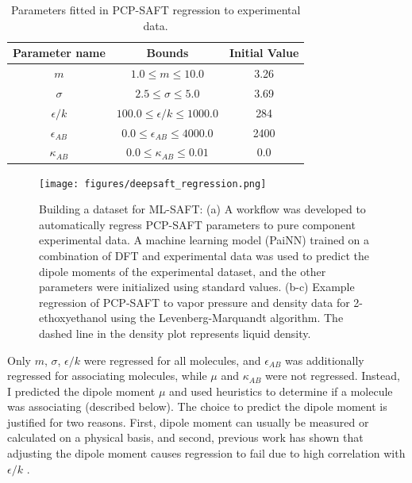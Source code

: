 \begin{table}
    \centering
    \caption{Parameters fitted in PCP-SAFT regression to experimental data.}
    \label{tab:regression_params}
    \begin{tabular}{ccc}
        Parameter name & Bounds & Initial Value \\
        \hline
        $m$ & $1.0 \leq m \leq 10.0$ & 3.26 \\
        $\sigma$ & $2.5 \leq \sigma \leq 5.0$ & 3.69 \\
        $\epsilon/k$ & $100.0 \leq \epsilon/k \leq 1000.0$ & 284 \\
        $\epsilon_{AB}$ & $0.0 \leq \epsilon_{AB} \leq 4000.0$ & 2400 \\
        $\kappa_{AB}$ & $0.0 \leq \kappa_{AB} \leq 0.01$ & 0.0 \\
    \end{tabular}
\end{table}


\begin{figure}
    \centering
    \texttt{[image: figures/deepsaft\_regression.png]}
    \caption{Building a dataset for ML-SAFT: (a) A workflow was developed to automatically regress PCP-SAFT parameters to pure component experimental data. A machine learning model (PaiNN) trained on  a combination of DFT and experimental data was used to predict the dipole moments of the experimental dataset, and the other parameters were initialized using standard values. (b-c) Example regression of PCP-SAFT to vapor pressure and density data for 2-ethoxyethanol using the Levenberg-Marquandt algorithm. The dashed line in the density plot represents liquid density.}
    \label{fig:ML-SAFT_regression}
\end{figure}

Only $m$, $\sigma$, $\epsilon/k$ were regressed for all molecules, and $\epsilon_{AB}$ was additionally regressed for associating molecules, while $\mu$ and $\kappa_{AB}$ were not regressed. Instead, I predicted the dipole moment $\mu$ and used heuristics to determine if a molecule was associating (described below). The choice to predict the dipole moment is justified for two reasons. First, dipole moment can usually be measured or calculated on a physical basis, and second, previous work has shown that adjusting the dipole moment causes regression to fail due to high correlation with $\epsilon/k$ \cite{Cripwell2017, deVilliers2011}. 

